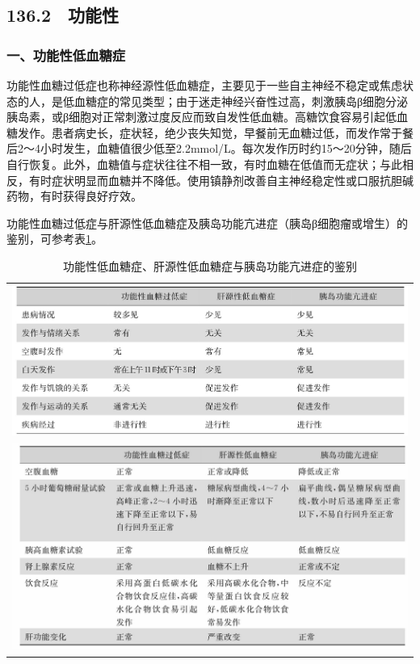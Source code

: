 \subsection{136.2　功能性}

\subsubsection{一、功能性低血糖症}

功能性血糖过低症也称神经源性低血糖症，主要见于一些自主神经不稳定或焦虑状态的人，是低血糖症的常见类型；由于迷走神经兴奋性过高，刺激胰岛β细胞分泌胰岛素，或β细胞对正常刺激过度反应而致自发性低血糖。高糖饮食容易引起低血糖发作。患者病史长，症状轻，绝少丧失知觉，早餐前无血糖过低，而发作常于餐后2～4小时发生，血糖值很少低至2.2mmol/L。每次发作历时约15～20分钟，随后自行恢复。此外，血糖值与症状往往不相一致，有时血糖在低值而无症状；与此相反，有时症状明显而血糖并不降低。使用镇静剂改善自主神经稳定性或口服抗胆碱药物，有时获得良好疗效。

功能性血糖过低症与肝源性低血糖症及胰岛功能亢进症（胰岛β细胞瘤或增生）的鉴别，可参考表\ref{tab41-3}。

\begin{longtable}{c}
 \caption{功能性低血糖症、肝源性低血糖症与胰岛功能亢进症的鉴别}
 \label{tab41-3}
 \endfirsthead
 \caption[]{功能性低血糖症、肝源性低血糖症与胰岛功能亢进症的鉴别}
 \endhead
 \includegraphics[width=\textwidth,height=\textheight,keepaspectratio]{./images/Image00252.jpg}\\
 \includegraphics[width=\textwidth,height=\textheight,keepaspectratio]{./images/Image00253.jpg}
 \end{longtable}

